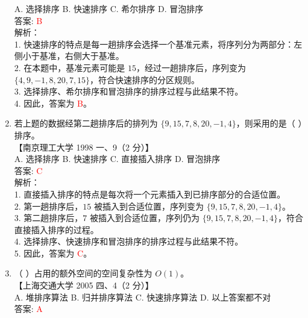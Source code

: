 \documentclass[lang=cn,newtx,10pt,scheme=chinese]{../../../elegantbook}
\begin{document}
\begin{enumerate}
    A. 选择排序 \quad B. 快速排序 \quad C. 希尔排序 \quad D. 冒泡排序 \\

    答案: \textcolor{red}{B} \\

    解析：\\
    1. 快速排序的特点是每一趟排序会选择一个基准元素，将序列分为两部分：左侧小于基准，右侧大于基准。\\
    2. 在本题中，基准元素可能是 $15$，经过一趟排序后，序列变为 $\{4, 9, -1, 8, 20, 7, 15\}$，符合快速排序的分区规则。\\
    3. 选择排序、希尔排序和冒泡排序的排序过程与此结果不符。\\
    4. 因此，答案为 \textcolor{red}{B}。\\

    \item 若上题的数据经第二趟排序后的排列为 $\{9, 15, 7, 8, 20, -1, 4\}$，则采用的是（ ）排序。\\
    【南京理工大学 1998 一、9（2 分）】 \\

    A. 选择排序 \quad B. 快速排序 \quad C. 直接插入排序 \quad D. 冒泡排序 \\

    答案: \textcolor{red}{C} \\

    解析：\\
    1. 直接插入排序的特点是每次将一个元素插入到已排序部分的合适位置。\\
    2. 第一趟排序后，$15$ 被插入到合适位置，序列变为 $\{9, 15, 7, 8, 20, -1, 4\}$。\\
    3. 第二趟排序后，$7$ 被插入到合适位置，序列仍为 $\{9, 15, 7, 8, 20, -1, 4\}$，符合直接插入排序的过程。\\
    4. 选择排序、快速排序和冒泡排序的排序过程与此结果不符。\\
    5. 因此，答案为 \textcolor{red}{C}。\\

    \item （ ）占用的额外空间的空间复杂性为 $O(1)$。\\
    【上海交通大学 2005 四、4（2 分）】\\  

    A. 堆排序算法 \quad B. 归并排序算法 \quad C. 快速排序算法 \quad D. 以上答案都不对 \\

    答案: \textcolor{red}{A} \\


\end{enumerate}
\end{document}

